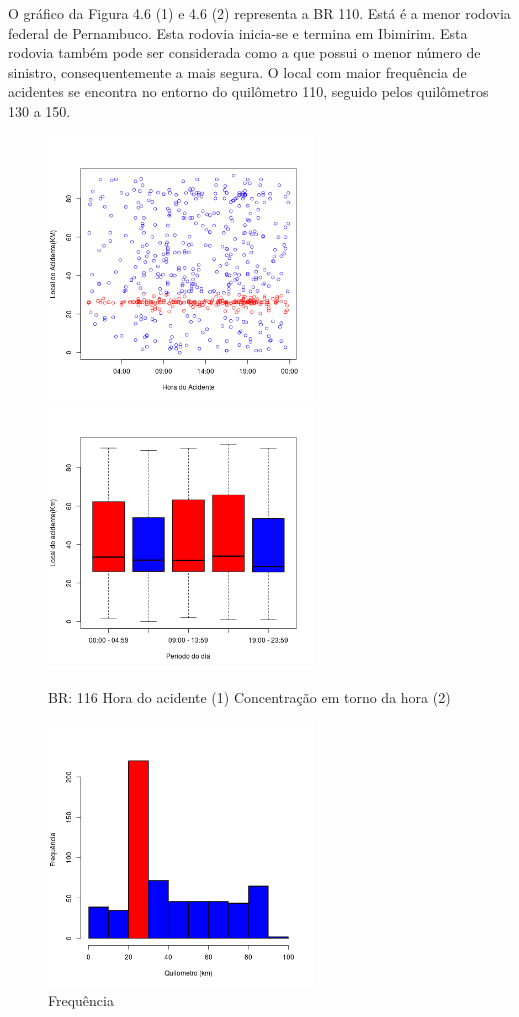 \pagebreak

O gráfico da Figura 4.6 (1) e 4.6 (2) representa a BR 110. Está é a menor rodovia federal de Pernambuco. Esta rodovia inicia-se e termina em Ibimirim. Esta rodovia também pode ser considerada como a que possui o menor número de sinistro, consequentemente a mais segura. O local com maior frequência de acidentes se encontra no entorno do quilômetro 110, seguido pelos quilômetros 130 a 150.

\pagebreak

\begin{figure}[h]
	\caption{BR: 116 Hora do acidente (1) Concentração em torno da hora (2)}
	\includegraphics[width=7cm,height=7cm]{Figuras/Preprocess/br116_1.png}
	\includegraphics[width=7cm,height=7cm]{Figuras/Preprocess/br116_2.png}

\end{figure}

\quad \quad
\begin{figure}[h]
	\centering
	\caption{ Frequência}
	\includegraphics[width=7cm,height=7cm]{Figuras/Preprocess/br116_3.png}
\end{figure}


